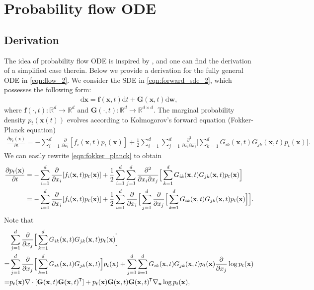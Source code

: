 \documentclass{article} \usepackage{iclr2021_conference,times}
\newcommand*{\tran}{^{\mkern-1.5mu\mathsf{T}}}
\newcommand{\mbf}[1]{\mathbf{#1}}
\newcommand{\mbb}[1]{\mathbb{#1}}
\newcommand{\ud}{\mathrm{d}}
\newcommand{\bfx}{\mathbf{x}}
\newcommand{\bfw}{\mathbf{w}}
\newcommand{\bff}{\mathbf{f}}
\newcommand{\bfG}{\mathbf{G}}
\begin{document}
\section{Probability flow ODE}\label{app:prob_flow_ode}
\subsection{Derivation}\label{app:prob_flow_derive}
The idea of probability flow ODE is inspired by \citet{maoutsa2020interacting}, and one can find the derivation of a simplified case therein. Below we provide a derivation for the fully general ODE in \cref{eqn:flow_2}. We consider the SDE in \cref{eqn:forward_sde_2}, which possesses the following form:
\begin{align*}
    \ud \bfx = \bff(\bfx, t) \ud t + \mbf{G}(\bfx, t) \ud \bfw,
\end{align*}
where $\bff(\cdot, t): \mbb{R}^d \to \mbb{R}^d$ and $\mbf{G}(\cdot, t): \mbb{R}^d \to \mbb{R}^{d\times d}$. The marginal probability density $p_t(\mbf{x}(t))$ evolves according to Kolmogorov's forward equation (Fokker-Planck equation)~\citep{oksendal2003stochastic}
\begin{align}
    \frac{\partial p_t(\bfx)}{\partial t} = -\sum_{i=1}^d \frac{\partial}{\partial x_i}[f_i(\bfx, t) p_t(\bfx)] + \frac{1}{2}\sum_{i=1}^d\sum_{j=1}^d \frac{\partial^2}{\partial x_i \partial x_j}\Big[\sum_{k=1}^d G_{ik}(\bfx, t) G_{jk}(\bfx, t) p_t(\bfx)\Big] \label{eqn:fokker_planck}.
\end{align}
We can easily rewrite \cref{eqn:fokker_planck} to obtain
\begin{align}
    \frac{\partial p_t(\bfx)}{\partial t} &= -\sum_{i=1}^d \frac{\partial}{\partial x_i}[f_i(\bfx, t) p_t(\bfx)] + \frac{1}{2}\sum_{i=1}^d\sum_{j=1}^d \frac{\partial^2}{\partial x_i \partial x_j}\Big[\sum_{k=1}^d G_{ik}(\bfx, t) G_{jk}(\bfx, t) p_t(\bfx)\Big]\notag \\
    &= -\sum_{i=1}^d \frac{\partial}{\partial x_i}[f_i(\bfx, t) p_t(\bfx)] + \frac{1}{2}\sum_{i=1}^d \frac{\partial}{\partial x_i} \Big[ \sum_{j=1}^d \frac{\partial}{\partial x_j}\Big[\sum_{k=1}^d G_{ik}(\bfx, t) G_{jk}(\bfx, t) p_t(\bfx)\Big]\Big]. \label{eqn:ode_part_1}
\end{align}
Note that
\begin{align*}
    &\sum_{j=1}^d \frac{\partial}{\partial x_j}\Big[\sum_{k=1}^d G_{ik}(\bfx, t) G_{jk}(\bfx, t) p_t(\bfx)\Big]\\
    =& \sum_{j=1}^d \frac{\partial}{\partial x_j} \Big[ \sum_{k=1}^d G_{ik}(\bfx, t) G_{jk}(\bfx, t) \Big] p_t(\bfx) + \sum_{j=1}^d \sum_{k=1}^d G_{ik}(\bfx, t)G_{jk}(\bfx, t) p_t(\bfx) \frac{\partial}{\partial x_j} \log p_t(\bfx)\\
    =& p_t(\bfx) \nabla \cdot [\bfG(\bfx, t)\bfG(\bfx, t)\tran] + p_t(\bfx) \bfG(\bfx, t)\bfG(\bfx, t)\tran \nabla_\bfx \log p_t(\bfx),
\end{align*}
\end{document}
